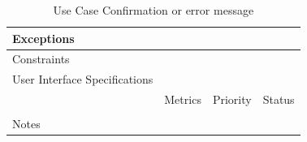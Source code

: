 \begin{table}[H]
\begin{tabularx}{\linewidth}{|l|X|X|X|}
            \hline Exceptions                    & \multicolumn{3}{l|}{}                                                                                 \\

            \hline Constraints                   & \multicolumn{3}{l|}{}                                                                                 \\

            \hline User Interface Specifications & \multicolumn{3}{l|}{}                                                                                 \\

            \hline \multirow{2}{*}{}             & Metrics                                                                           & Priority & Status \\
            \cline{2-4}                          &                                                                                   &          &        \\
            \hline Notes                         & \multicolumn{3}{l|}{}                                                                                 \\
            \hline
      \end{tabularx}
      \caption{Use Case Confirmation or error message}
      \label{tab:use_case_confirmation_or_error_message}
\end{table}

